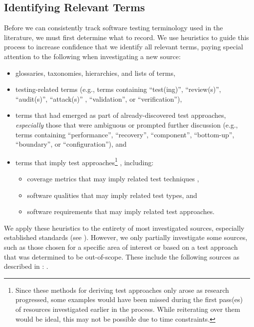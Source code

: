 \subsection{Identifying Relevant Terms}\label{ident-terms}
Before we can consistently track software testing terminology used in the
literature, we must first determine what to record. We use heuristics to guide
this process to increase confidence that we identify all relevant terms, paying
special attention to the following when investigating a new source:
\begin{itemize}
    \item glossaries, taxonomies, hierarchies, and lists of terms,
    \item testing-related terms (e.g., terms containing ``test(ing)'',
          \ifnotpaper ``review(s)'', ``audit(s)'', ``attack(s)''%
              , \fi ``validation'', or ``verification''),
    \item terms that had emerged as part of already-discovered
          test approaches, \emph{especially} those that were ambiguous
          or prompted further discussion (e.g., terms containing
          ``performance'', ``recovery'', ``component'', ``bottom-up'',
          \ifnotpaper ``boundary'', \fi or ``configuration''), and
    \item terms that imply test approaches\ifnotpaper\footnote{
                  Since these methods for deriving test approaches only arose
                  as research progressed, some examples would have been missed
                  during the first pass(es) of resources investigated earlier
                  in the process. While reiterating over them would be ideal,
                  this may not be possible due to time constraints.
              }%
          \fi, including:
          \newcommand\derivTest[2]{#1 that may imply \ifnotpaper related \fi test #2}
          \begin{itemize}
              \item \derivTest{coverage metrics}{techniques}%
                    ,
              \item {}\label{qual-types}
                    \derivTest{software qualities}{types}, and
              \item {}\label{req-apps}
                    \derivTest{\ifnotpaper software \fi requirements}{approaches}.
          \end{itemize}
\end{itemize}
We apply these heuristics to the entirety of most investigated sources,
especially established standards (see ). However, we only partially
investigate some sources, such as those chosen for a specific area of
interest or based on a test approach that was determined to be out-of-scope.
These include the following sources as described in :
\citet{ISO2022,ISO2015,Dominguez-PumarEtAl2020,PierreEtAl2017,
    TrudnowskiEtAl2017,YuEtAl2011,Tsui2007,Goralski1999}.

